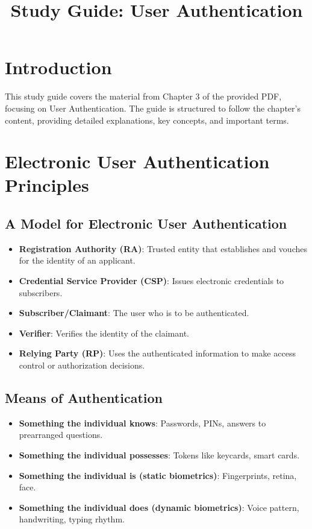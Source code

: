 \documentclass{article}
\title{Study Guide: User Authentication}
\author{}
\date{}
\begin{document}
\maketitle

\tableofcontents

\section{Introduction}
This study guide covers the material from Chapter 3 of the provided PDF, focusing on User Authentication. The guide is structured to follow the chapter's content, providing detailed explanations, key concepts, and important terms.

\section{Electronic User Authentication Principles}
\subsection{A Model for Electronic User Authentication}
\begin{itemize}
    \item \textbf{Registration Authority (RA)}: Trusted entity that establishes and vouches for the identity of an applicant.
    \item \textbf{Credential Service Provider (CSP)}: Issues electronic credentials to subscribers.
    \item \textbf{Subscriber/Claimant}: The user who is to be authenticated.
    \item \textbf{Verifier}: Verifies the identity of the claimant.
    \item \textbf{Relying Party (RP)}: Uses the authenticated information to make access control or authorization decisions.
\end{itemize}

\subsection{Means of Authentication}
\begin{itemize}
    \item \textbf{Something the individual knows}: Passwords, PINs, answers to prearranged questions.
    \item \textbf{Something the individual possesses}: Tokens like keycards, smart cards.
    \item \textbf{Something the individual is (static biometrics)}: Fingerprints, retina, face.
    \item \textbf{Something the individual does (dynamic biometrics)}: Voice pattern, handwriting, typing rhythm.
\end{itemize}
\end{document}
